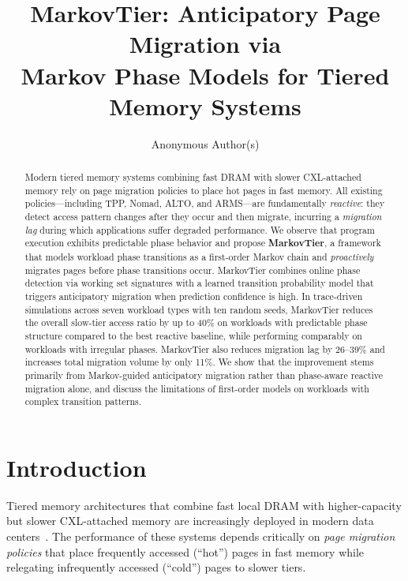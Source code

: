 \documentclass[preprint]{article}
\title{MarkovTier: Anticipatory Page Migration via\\Markov Phase Models for Tiered Memory Systems}
\author{
  Anonymous Author(s)
}
\begin{document}
\maketitle

\begin{abstract}
Modern tiered memory systems combining fast DRAM with slower CXL-attached memory rely on page migration policies to place hot pages in fast memory. All existing policies---including TPP, Nomad, ALTO, and ARMS---are fundamentally \emph{reactive}: they detect access pattern changes after they occur and then migrate, incurring a \emph{migration lag} during which applications suffer degraded performance. We observe that program execution exhibits predictable phase behavior and propose \textbf{MarkovTier}, a framework that models workload phase transitions as a first-order Markov chain and \emph{proactively} migrates pages before phase transitions occur. MarkovTier combines online phase detection via working set signatures with a learned transition probability model that triggers anticipatory migration when prediction confidence is high. In trace-driven simulations across seven workload types with ten random seeds, MarkovTier reduces the overall slow-tier access ratio by up to 40\% on workloads with predictable phase structure compared to the best reactive baseline, while performing comparably on workloads with irregular phases. MarkovTier also reduces migration lag by 26--39\% and increases total migration volume by only 11\%. We show that the improvement stems primarily from Markov-guided anticipatory migration rather than phase-aware reactive migration alone, and discuss the limitations of first-order models on workloads with complex transition patterns.
\end{abstract}

\section{Introduction}

Tiered memory architectures that combine fast local DRAM with higher-capacity but slower CXL-attached memory are increasingly deployed in modern data centers~\citep{maruf2023tpp, xiang2024nomad, liu2025hotness}. The performance of these systems depends critically on \emph{page migration policies} that place frequently accessed (``hot'') pages in fast memory while relegating infrequently accessed (``cold'') pages to slower tiers.
\end{document}

